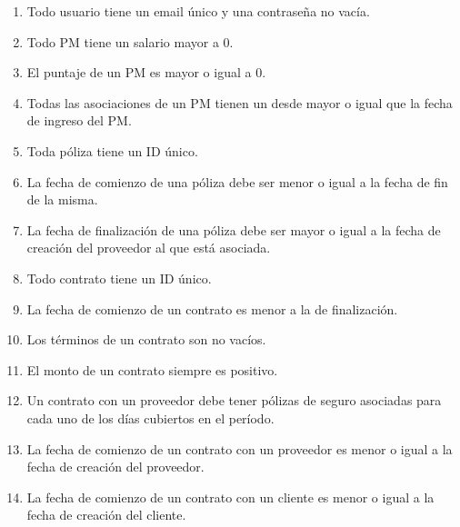 \documentclass{article}
\theoremstyle{definition}
\theoremstyle{remark}
\begin{document}
\begin{enumerate}
    \item Todo usuario tiene un email único y una contraseña no vacía.
    \item Todo PM tiene un salario mayor a 0.
    \item El puntaje de un PM es mayor o igual a 0.
    \item Todas las asociaciones de un PM tienen un desde mayor o igual que la fecha de ingreso del PM.
    
    \item Toda póliza tiene un ID único.
    \item La fecha de comienzo de una póliza debe ser menor o igual a la fecha de fin de la misma.
    \item La fecha de finalización de una póliza debe ser mayor o igual a la fecha de creación del proveedor al que está asociada.
    
    \item Todo contrato tiene un ID único.
    \item La fecha de comienzo de un contrato es menor a la de finalización.
    \item Los términos de un contrato son no vacíos.
    \item El monto de un contrato siempre es positivo.
    \item Un contrato con un proveedor debe tener pólizas de seguro asociadas para cada uno de los días cubiertos en el período.
    \item La fecha de comienzo de un contrato con un proveedor es menor o igual a la fecha de creación del proveedor.
    \item La fecha de comienzo de un contrato con un cliente es menor o igual a la fecha de creación del cliente.
    

\end{enumerate}
\end{document}
